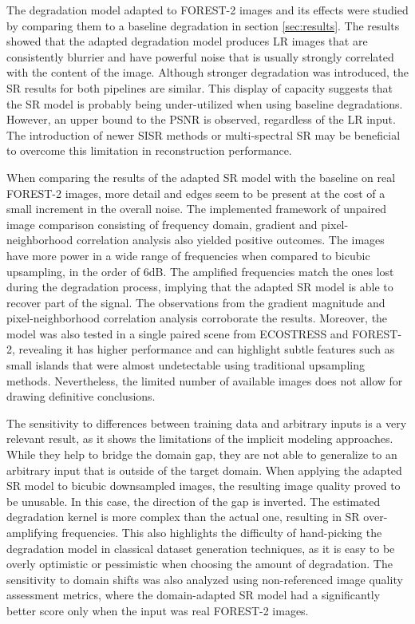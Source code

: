 The degradation model adapted to FOREST-2 images and its effects were studied by comparing them to a baseline degradation in section \ref{sec:results}. The results showed that the adapted degradation model produces LR images that are consistently blurrier and have powerful noise that is usually strongly correlated with the content of the image. Although stronger degradation was introduced, the SR results for both pipelines are similar. 
This display of capacity suggests that the SR model is probably being under-utilized when using baseline degradations. However, an upper bound to the PSNR is observed, regardless of the LR input. The introduction of newer SISR methods or multi-spectral SR may be beneficial to overcome this limitation in reconstruction performance.

When comparing the results of the adapted SR model with the baseline on real FOREST-2 images, more detail and edges seem to be present at the cost of a small increment in the overall noise. The implemented framework of unpaired image comparison consisting of frequency domain, gradient and pixel-neighborhood correlation analysis also yielded positive outcomes. 
The images have more power in a wide range of frequencies when compared to bicubic upsampling, in the order of 6dB. The amplified frequencies match the ones lost during the degradation process, implying that the adapted SR model is able to recover part of the signal. The observations from the gradient magnitude and pixel-neighborhood correlation analysis corroborate the results. Moreover, the model was also tested in a single paired scene from ECOSTRESS and FOREST-2, revealing it has higher performance and can highlight subtle features such as small islands that were almost undetectable using traditional upsampling methods. Nevertheless, the limited number of available images does not allow for drawing definitive conclusions.

The sensitivity to differences between training data and arbitrary inputs is a very relevant result, as it shows the limitations of the implicit modeling approaches. While they help to bridge the domain gap, they are not able to generalize to an arbitrary input that is outside of the target domain.
When applying the adapted SR model to bicubic downsampled images, the resulting image quality proved to be unusable.
In this case, the direction of the gap is inverted. The estimated degradation kernel is more complex than the actual one, resulting in SR over-amplifying frequencies. This also highlights the difficulty of hand-picking the degradation model in classical dataset generation techniques, as it is easy to be overly optimistic or pessimistic when choosing the amount of degradation.
The sensitivity to domain shifts was also analyzed using non-referenced image quality assessment metrics, where the domain-adapted SR model had a significantly better score only when the input was real FOREST-2 images. 

